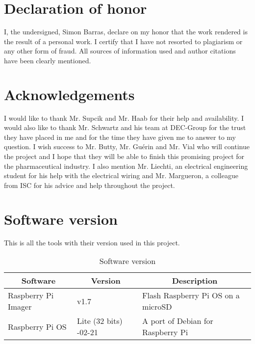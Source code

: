 \chapter{Declaration of honor}
\label{ch:honour}
I, the undersigned, Simon Barras, declare on my honor that the work rendered is the result of a
personal work. I certify that I have not resorted to plagiarism or any other form of fraud.
All sources of information used and author citations have been clearly mentioned.



\chapter{Acknowledgements}
\label{ch:remerciement}
I would like to thank Mr. Supcik and Mr. Haab for their help and availability.
I would also like to thank Mr. Schwartz and his team at DEC-Group for the trust they have placed in me and for the time they have given me to answer to my question.
I wish success to Mr. Butty, Mr. Guérin and Mr. Vial who will continue the project and I hope that they will be able to finish this promising project for the pharmaceutical industry.
I also mention Mr. Liechti, an electrical engineering student for his help with the electrical wiring and Mr. Margueron, a colleague from ISC for his advice and help throughout the project.


\chapter{Software version}
\label{ch:software}
This is all the tools with their version used in this project.

\begin{table}[ht]
    \centering
    \begin{tabular}{|l|p{3cm}|l|}
    \hline
    \multicolumn{1}{|c|}{\textbf{Software}} & \multicolumn{1}{c|}{\textbf{Version}} & \multicolumn{1}{c|}{\textbf{Description}} \\ \hline
    Raspberry Pi Imager                     & v1.7                                  & Flash Raspberry Pi OS on a microSD        \\ \hline
    Raspberry Pi OS                         & Lite (32 bits) \newline 2023-02-21  & A port of Debian for Raspberry Pi         \\ \hline
    \end{tabular}
    \caption{Software version}
    \label{tab:softwareVersion}
\end{table}